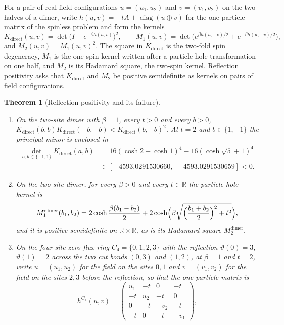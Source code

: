 \documentclass[11pt]{article}
\newtheorem{theorem}{Theorem}[section]
\theoremstyle{definition}
\theoremstyle{remark}
\DeclareMathOperator{\diag}{diag}
\newcommand{\R}{\mathbb{R}}
\begin{document}
For a pair of real field configurations $u=(u_1,u_2)$ and $v=(v_1,v_2)$ on the two
halves of a dimer, write $h(u,v)=-tA+\diag(u\oplus v)$ for the one-particle matrix of
the spinless problem and form the kernels
\[
K_{\mathrm{direct}}(u,v)=\det\bigl(I+e^{-\beta h(u,v)}\bigr)^2,\qquad
M_1(u,v)=\det\bigl(e^{\beta h(u,-v)/2}+e^{-\beta h(u,-v)/2}\bigr),
\]
and $M_2(u,v)=M_1(u,v)^2$. The square in $K_{\mathrm{direct}}$ is the two-fold spin degeneracy, $M_1$ is
the one-spin kernel written after a particle-hole transformation on one half, and
$M_2$ is its Hadamard square, the two-spin kernel. Reflection positivity asks that
$K_{\mathrm{direct}}$ and $M_2$ be positive semidefinite as kernels on pairs of field
configurations.

\begin{theorem}[Reflection positivity and its failure]
\label{thm:rp}
\mbox{}
\begin{enumerate}[label=(\roman*),leftmargin=2.2em]
\item On the two-site dimer with $\beta=1$, every $t>0$ and every $b>0$,
$K_{\mathrm{direct}}(b,b)K_{\mathrm{direct}}(-b,-b)<K_{\mathrm{direct}}(b,-b)^2$. At
$t=2$ and $b\in\{1,-1\}$ the principal minor is enclosed in
\begin{equation}
\begin{aligned}
\det_{a,b\in\{-1,1\}}K_{\mathrm{direct}}(a,b)
&=16(\cosh2+\cosh1)^4-16(\cosh\sqrt5+1)^4 \\
&\in[-4593.0291530660,\,-4593.0291530659]<0 .
\end{aligned}
\label{eq:dimerfail}
\end{equation}
\item On the two-site dimer, for every $\beta>0$ and every $t\in\R$ the
particle-hole kernel is
\begin{equation}
M_1^{\mathrm{dimer}}(b_1,b_2)=2\cosh\frac{\beta(b_1-b_2)}{2}
+2\cosh\Bigl(\beta\sqrt{\Bigl(\frac{b_1+b_2}{2}\Bigr)^2+t^2}\Bigr),
\label{eq:dimerph}
\end{equation}
and it is positive semidefinite on $\R\times\R$, as is its Hadamard square $M_2^{\mathrm{dimer}}$.
\item On the four-site zero-flux ring $C_4=\{0,1,2,3\}$ with the reflection
$\vartheta(0)=3$, $\vartheta(1)=2$ across the two cut bonds $(0,3)$ and $(1,2)$, at
$\beta=1$ and $t=2$, write $u=(u_1,u_2)$ for the field on the sites $0,1$ and
$v=(v_1,v_2)$ for the field on the sites $2,3$ before the reflection, so that the
one-particle matrix is
\begin{equation}
h^{C_4}(u,v)=\begin{pmatrix}u_1&-t&0&-t\\-t&u_2&-t&0\\0&-t&-v_2&-t\\-t&0&-t&-v_1\end{pmatrix},

\end{equation}
\end{enumerate}
\end{theorem}
\end{document}
